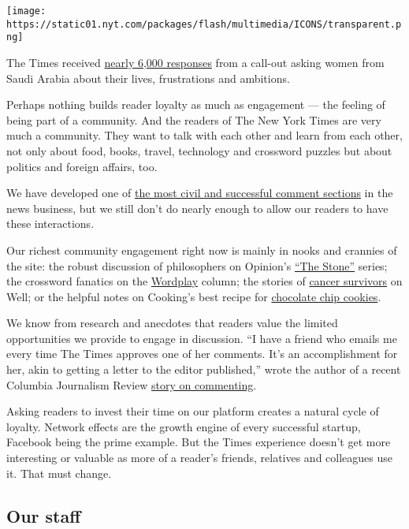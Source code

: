 \texttt{[image: https://static01.nyt.com/packages/flash/multimedia/ICONS/transparent.png]}

The Times received
\href{https://mobile.nytimes.com/2016/10/29/world/middleeast/saudi-arabia-women.html?referer=}{nearly
6,000 responses} from a call-out asking women from Saudi Arabia about
their lives, frustrations and ambitions.

Perhaps nothing builds reader loyalty as much as engagement --- the
feeling of being part of a community. And the readers of The New York
Times are very much a community. They want to talk with each other and
learn from each other, not only about food, books, travel, technology
and crossword puzzles but about politics and foreign affairs, too.

We have developed one of
\href{https://www.nytimes.com/times-insider/2014/04/17/a-comments-path-to-publication/}{the
most civil and successful comment sections} in the news business, but we
still don't do nearly enough to allow our readers to have these
interactions.

Our richest community engagement right now is mainly in nooks and
crannies of the site: the robust discussion of philosophers on Opinion's
\href{https://www.nytimes.com/2017/01/09/opinion/is-humanism-really-humane.html}{``The
Stone''} series; the crossword fanatics on the
\href{https://www.nytimes.com/column/wordplay}{Wordplay} column; the
stories of
\href{http://well.blogs.nytimes.com/projects/breast-cancer-stories}{cancer
survivors} on Well; or the helpful notes on Cooking's best recipe for
\href{https://cooking.nytimes.com/recipes/1015819-chocolate-chip-cookies}{chocolate
chip cookies}.

We know from research and anecdotes that readers value the limited
opportunities we provide to engage in discussion. ``I have a friend who
emails me every time The Times approves one of her comments. It's an
accomplishment for her, akin to getting a letter to the editor
published,'' wrote the author of a recent Columbia Journalism Review
\href{http://www.cjr.org/first_person/comments_articles_publishers.php}{story
on commenting}.

Asking readers to invest their time on our platform creates a natural
cycle of loyalty. Network effects are the growth engine of every
successful startup, Facebook being the prime example. But the Times
experience doesn't get more interesting or valuable as more of a
reader's friends, relatives and colleagues use it. That must change.

\hypertarget{our-staff}{%
\subsection{Our staff}\label{our-staff}}

